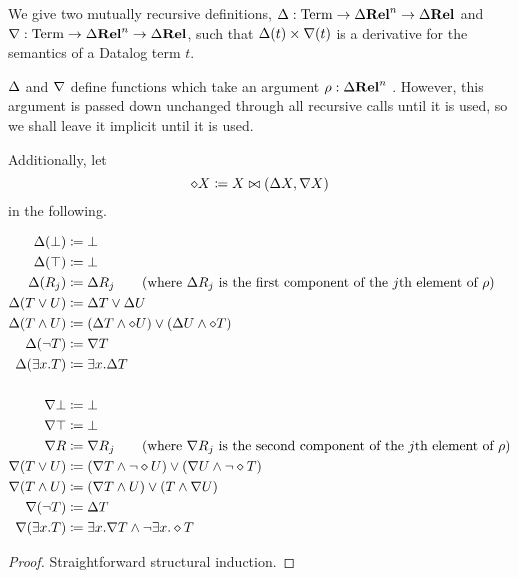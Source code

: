 \newcommand{\bothdiff}{\diamond}
\newcommand{\bothchanges}{\rho}
\begin{thm}
\label{thm:concreteDatalog}
  We give two mutually recursive definitions,
  $\Delta: \mathrm{Term} \rightarrow \Delta \mathbf{Rel}^n \rightarrow \Delta \mathbf{Rel}$ and
  $\nabla: \mathrm{Term} \rightarrow \Delta \mathbf{Rel}^n \rightarrow \Delta \mathbf{Rel}$, such
  that $\Delta(t) \times \nabla(t)$ is a derivative for the semantics of a Datalog term $t$.

  $\Delta$ and $\nabla$ define functions which take an argument
  $\bothchanges: \changes{\Rel^n}$ . However, this argument is passed down
  unchanged through all recursive calls until it is used, so we shall leave it
  implicit until it is used.

  Additionally, let
  \begin{displaymath}
    \diamond X \coloneqq X \bowtie (\Delta X, \nabla X)
  \end{displaymath}
  in the following.

  \begin{align*}
  \updiff(\bot) &\defeq \bot\\
  \updiff(\top) &\defeq \bot\\
  \updiff(R_j) &\defeq \updiff R_j \tag{where $\updiff R_j$ is the first component of the $j$th element of $\bothchanges$}\\
  \updiff(T\vee U) &\defeq \updiff T \vee \updiff U\\
  \updiff(T\wedge U) &\defeq (\updiff T\wedge \bothdiff U)
                           \vee
                           (\updiff U \wedge \bothdiff T)\\
  \updiff(\neg T) &\defeq \downdiff T\\
  \updiff(\exists x.T) &\defeq \exists x.\updiff T\\
    \\
  \downdiff\bot &\defeq \bot\\
  \downdiff\top &\defeq \bot\\
  \downdiff R &\defeq \downdiff R_j \tag{where $\downdiff R_j$ is the second component of the $j$th element of $\bothchanges$}\\
  \downdiff(T\vee U) &\defeq (\downdiff T \wedge \neg \bothdiff U)
                           \vee
                           (\downdiff U \wedge \neg \bothdiff T)\\
  \downdiff(T\wedge U) &\defeq (\downdiff T\wedge U) \vee (T \wedge \downdiff U)\\
  \downdiff(\neg T) &\defeq \updiff T\\
  \downdiff(\exists x.T) &\defeq \exists x.\downdiff T \wedge \neg \exists x.\bothdiff T
  \end{align*}
\end{thm}
\ifproofs
\begin{proof}
  Straightforward structural induction.
\end{proof}
\fi

